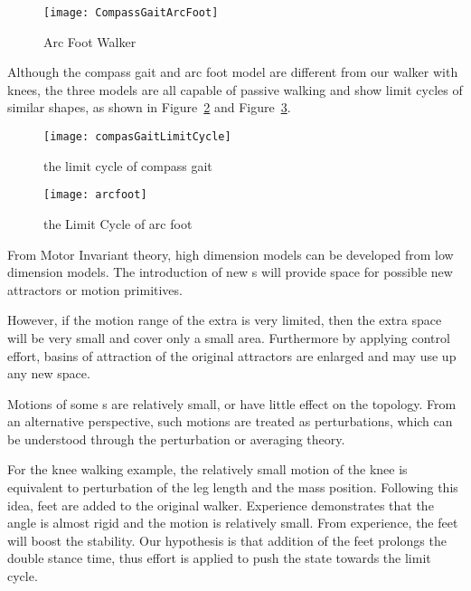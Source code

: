 \begin{figure}[!htbp]
  \begin{center}
      \texttt{[image: CompassGaitArcFoot]}
    \caption{Arc Foot Walker}
    \label{fig:arcfoot}
\end{center}
\end{figure}






Although the compass gait and arc foot model are different from  our walker with knees, the three models are all capable of passive walking and show limit cycles of similar shapes, as shown in Figure~\ref{fig:compassgaitlimitcycle} and Figure~\ref{fig:arcfootlimitcycle}.
\begin{figure}[!htbp]
  \begin{center}
      \texttt{[image: compasGaitLimitCycle]}
    \caption{the limit cycle of compass gait}
    \label{fig:compassgaitlimitcycle}
\end{center}
\end{figure}

\begin{figure}[!htbp]
  \begin{center}
      \texttt{[image: arcfoot]}
    \caption{the Limit Cycle of arc foot}
    \label{fig:arcfootlimitcycle}
\end{center}
\end{figure}

From Motor Invariant theory, high dimension models can be developed from low dimension models. 
The introduction of new {\dof}s will provide space for possible new attractors or motion primitives.

However, if the motion range of the extra {\dof} is very limited, then the extra space will be very small and cover only a small area. Furthermore by applying control effort, basins of attraction of the original attractors are enlarged and may use up any new space.






Motions of some {\dof}s are relatively small, or have little effect on the topology.
From an alternative perspective, such motions are treated as perturbations, which can be understood through the perturbation or averaging theory\citep{khalil2002nonlinear}.


For the knee walking example, the relatively small motion of the knee is equivalent to perturbation of the leg length and the mass position.
Following this idea, feet are added to the original walker.
Experience demonstrates that the angle is almost rigid and the motion is relatively small.
From experience, the feet will boost the stability.
Our hypothesis is that addition of the feet prolongs the double stance time, thus effort is applied to push the state towards the limit cycle.

